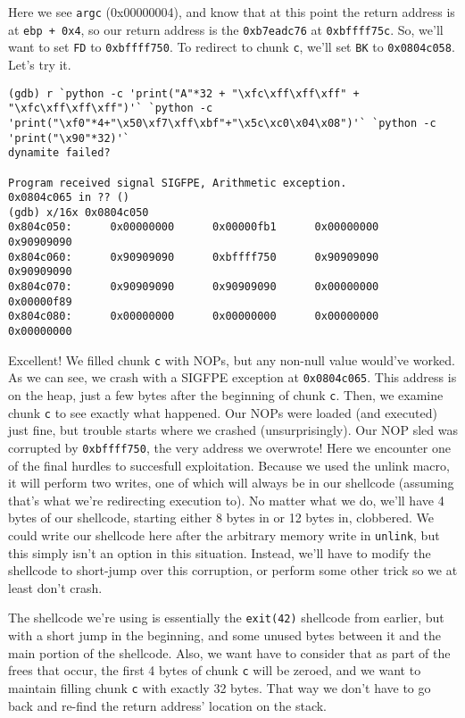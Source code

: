 Here we see \texttt{argc} (0x00000004), and know that at this point the return
address is at \texttt{ebp + 0x4}, so our return address is the \texttt{0xb7eadc76}
at \texttt{0xbffff75c}. So, we'll want to set \texttt{FD} to \texttt{0xbffff750}.
To redirect to chunk \texttt{c}, we'll set \texttt{BK} to \texttt{0x0804c058}.
Let's try it.

\begin{lstlisting}
(gdb) r `python -c 'print("A"*32 + "\xfc\xff\xff\xff" + "\xfc\xff\xff\xff")'` `python -c 'print("\xf0"*4+"\x50\xf7\xff\xbf"+"\x5c\xc0\x04\x08")'` `python -c 'print("\x90"*32)'`
dynamite failed?

Program received signal SIGFPE, Arithmetic exception.
0x0804c065 in ?? ()
(gdb) x/16x 0x0804c050
0x804c050:      0x00000000      0x00000fb1      0x00000000      0x90909090
0x804c060:      0x90909090      0xbffff750      0x90909090      0x90909090
0x804c070:      0x90909090      0x90909090      0x00000000      0x00000f89
0x804c080:      0x00000000      0x00000000      0x00000000      0x00000000
\end{lstlisting}

Excellent! We filled chunk \texttt{c} with NOPs, but any non-null value would've worked.
As we can see, we crash with a SIGFPE exception at \texttt{0x0804c065}. This address is
on the heap, just a few bytes after the beginning of chunk \texttt{c}. Then, we examine
chunk \texttt{c} to see exactly what happened. Our NOPs were loaded (and executed) just
fine, but trouble starts where we crashed (unsurprisingly). Our NOP sled was corrupted
by \texttt{0xbffff750}, the very address we overwrote! Here we encounter one of the
final hurdles to succesfull exploitation. Because we used the unlink macro, it will
perform two writes, one of which will always be in our shellcode (assuming that's what
we're redirecting execution to). No matter what we do, we'll have 4 bytes of our shellcode,
starting either 8 bytes in or 12 bytes in, clobbered. We could write our shellcode
here after the arbitrary memory write in \texttt{unlink}, but this simply isn't
an option in this situation. Instead, we'll have to modify the shellcode to
short-jump over this corruption, or perform some other trick so we at least
don't crash.

The shellcode we're using is essentially the \texttt{exit(42)} shellcode from earlier,
but with a short jump in the beginning, and some unused bytes between it and the
main portion of the shellcode. Also, we want have to consider that as part
of the frees that occur, the first 4 bytes of chunk \texttt{c} will be zeroed, and
we want to maintain filling chunk \texttt{c} with exactly 32 bytes. That way we
don't have to go back and re-find the return address' location on the stack.


